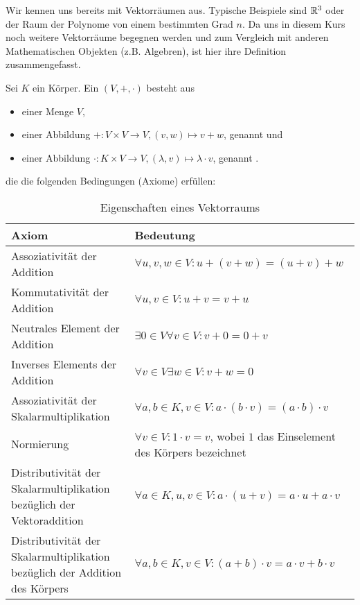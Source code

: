 Wir kennen uns bereits mit Vektorräumen aus. Typische Beispiele sind $\mathbb{R}^3$ oder der Raum der Polynome von einem bestimmten Grad $n$. Da uns in diesem Kurs noch weitere Vektorräume begegnen werden und zum Vergleich mit anderen Mathematischen Objekten (z.B. Algebren), ist hier ihre Definition zusammengefasst.


\begin{definition}[Vektorräume]\label{vektorraeume:def}
	Sei $K$ ein Körper. Ein  $(V,+,\cdot)$ besteht aus
	\begin{itemize}
		\item einer Menge $V$,
		\item einer Abbildung $+: V \times V \to V, (v,w) \mapsto v+w$, genannt  und
		\item einer Abbildung $\cdot: K \times V \to V, (\lambda,v) \mapsto \lambda\cdot v$, genannt .
	\end{itemize}
	die die folgenden Bedingungen (Axiome) erfüllen:
		
		\begin{table}[!ht]
			\setlength\extrarowheight{10pt} %
			\begin{tabularx}{\textwidth}{p{7cm} X}
				
				\toprule
				\textbf{Axiom}                                                              & \textbf{Bedeutung} \\
				\midrule
				Assoziativität der Addition                                                 & $\forall u,v,w\in V: u+(v+w) = (u+v)+w$  \\
				Kommutativität der Addition                                                 & $\forall u,v\in V: u+v=v+u$ \\
				Neutrales Element der Addition                                              & $\exists 0\in V\forall v\in V: v+0=0+v$  \\
				Inverses Elements der Addition                                              & $\forall v \in V\exists w \in V: v+w=0$ \\
				Assoziativität der Skalarmultiplikation                                     & $\forall a,b\in K, v\in V: a\cdot(b\cdot v) = (a\cdot b)\cdot v$ \\
				Normierung                                                                  & $\forall v \in V: 1 \cdot v = v$, wobei $1$ das Einselement des Körpers bezeichnet \\
				Distributivität der Skalarmultiplikation bezüglich der Vektoraddition       & $\forall a\in K, u,v\in V: a\cdot(u + v) = a\cdot u + a\cdot v$ \\
				Distributivität der Skalarmultiplikation bezüglich der Addition des Körpers & $\forall a,b\in K, v\in V: (a + b)\cdot v = a\cdot v + b\cdot v$ \\
				\bottomrule
			\end{tabularx}
			\caption{Eigenschaften eines Vektorraums}
		\end{table}
\end{definition}